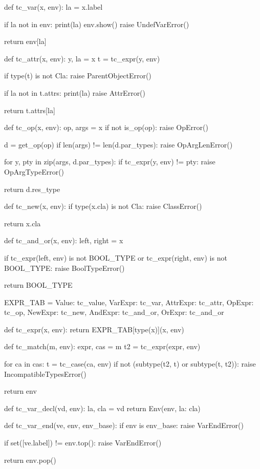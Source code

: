 \begin{dispPy}
def tc_var(x, env):
    la = x.label

    if la not in env:
        print(la)
        env.show()
        raise UndefVarError()

    return env[la]

def tc_attr(x, env):
    y, la = x
    t = tc_expr(y, env)

    if type(t) is not Cla:
        raise ParentObjectError()

    if la not in t.attrs:
        print(la)
        raise AttrError()

    return t.attrs[la]

def tc_op(x, env):
    op, args = x
    if not is_op(op):
        raise OpError()

    d = get_op(op)
    if len(args) != len(d.par_types):
        raise OpArgLenError()

    for y, pty in zip(args, d.par_types):
        if tc_expr(y, env) != pty:
            raise OpArgTypeError()

    return d.res_type

def tc_new(x, env):
    if type(x.cla) is not Cla:
        raise ClassError()

    return x.cla

def tc_and_or(x, env):
    left, right = x

    if tc_expr(left, env) is not BOOL_TYPE or tc_expr(right, env) is not BOOL_TYPE:
        raise BoolTypeError()

    return BOOL_TYPE

EXPR_TAB = {
    Value: tc_value,
    VarExpr: tc_var,
    AttrExpr: tc_attr,
    OpExpr: tc_op,
    NewExpr: tc_new,
    AndExpr: tc_and_or,
    OrExpr: tc_and_or}

def tc_expr(x, env):
    return EXPR_TAB[type(x)](x, env)

def tc_match(m, env):
    expr, cas = m
    t2 = tc_expr(expr, env)

    for ca in cas:
        t = tc_case(ca, env)
        if not (subtype(t2, t) or subtype(t, t2)):
            raise IncompatibleTypesError()

    return env

def tc_var_decl(vd, env):
    la, cla = vd
    return Env(env, {la: cla})

def tc_var_end(ve, env, env_base):
    if env is env_base:
        raise VarEndError()

    if set([ve.label]) != env.top():
        raise VarEndError()

    return env.pop()


\end{dispPy}
